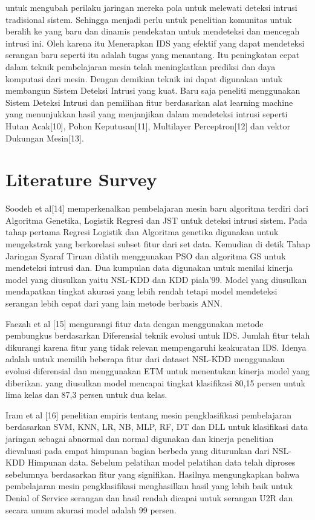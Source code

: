 \documentclass[conference]{IEEEtran}
\begin{document}
untuk mengubah perilaku jaringan mereka pola untuk melewati deteksi intrusi tradisional sistem. Sehingga menjadi perlu untuk penelitian komunitas untuk beralih ke yang baru dan dinamis pendekatan untuk mendeteksi dan mencegah intrusi ini. Oleh karena itu Menerapkan IDS yang efektif yang dapat mendeteksi serangan baru seperti itu adalah tugas yang menantang. Itu peningkatan cepat dalam teknik pembelajaran mesin telah meningkatkan prediksi dan daya komputasi dari mesin. Dengan demikian teknik ini dapat digunakan untuk membangun Sistem Deteksi Intrusi yang kuat. Baru saja peneliti menggunakan Sistem Deteksi Intrusi dan pemilihan fitur berdasarkan alat learning machine yang menunjukkan hasil yang menjanjikan dalam mendeteksi intrusi seperti Hutan Acak[10]\cite{ambikavathi2020predictor}, Pohon Keputusan[11]\cite{sarker2020intrudtree}, Multilayer Perceptron[12]\cite{moukhafi2020intelligent} dan vektor Dukungan Mesin[13]\cite{safaldin2021improved}.
\section{Literature Survey}
Soodeh et al[14]\cite{hosseini2020new} memperkenalkan pembelajaran mesin baru algoritma terdiri dari Algoritma Genetika, Logistik Regresi dan JST untuk deteksi intrusi sistem. Pada tahap pertama Regresi Logistik dan Algoritma genetika digunakan untuk mengekstrak yang berkorelasi subset fitur dari set data. Kemudian di detik Tahap Jaringan Syaraf Tiruan dilatih menggunakan PSO dan algoritma GS untuk mendeteksi intrusi dan. Dua kumpulan data digunakan untuk menilai kinerja model yang diusulkan yaitu NSL-KDD dan KDD piala'99. Model yang diusulkan mendapatkan tingkat akurasi yang lebih rendah tetapi model mendeteksi serangan lebih cepat dari yang lain metode berbasis ANN. 

Faezah et al [15]\cite{almasoudy2020differential} mengurangi fitur data dengan menggunakan metode pembungkus berdasarkan Diferensial teknik evolusi untuk IDS. Jumlah fitur telah dikurangi karena fitur yang tidak relevan mempengaruhi keakuratan IDS. Idenya adalah untuk memilih beberapa fitur dari dataset NSL-KDD menggunakan evolusi diferensial dan menggunakan ETM untuk menentukan kinerja model yang diberikan. yang diusulkan model mencapai tingkat klasifikasi 80,15 persen untuk lima kelas dan 87,3 persen  untuk dua kelas. 

Iram et al [16]\cite{abrar2020machine} penelitian empiris tentang mesin pengklasifikasi pembelajaran berdasarkan SVM, KNN, LR, NB, MLP, RF, DT dan DLL untuk klasifikasi data jaringan sebagai abnormal dan normal digunakan dan kinerja penelitian dievaluasi pada empat himpunan bagian berbeda yang diturunkan dari NSL-KDD Himpunan data. Sebelum pelatihan model pelatihan data telah diproses sebelumnya berdasarkan fitur yang signifikan. Hasilnya mengungkapkan bahwa pembelajaran mesin pengklasifikasi menghasilkan hasil yang lebih baik untuk Denial of Service serangan dan hasil rendah dicapai untuk serangan U2R dan secara umum akurasi model adalah 99 persen. 
\end{document}
